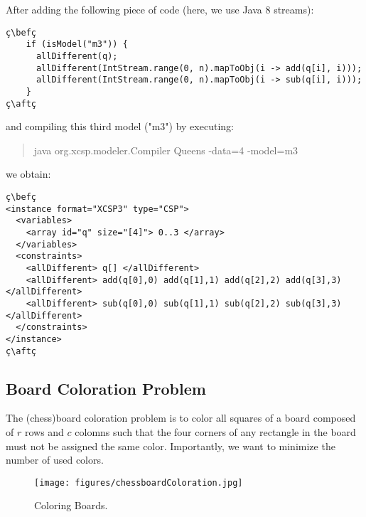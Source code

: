 \documentclass[10pt]{article}
\newcommand{\nn}[1]{{\tt #1}} %
\newenvironment{myvb}{\endgraf\small\verbatim}{\endverbatim}
\def\bef{\rule{10cm}{0.1mm}} %
\def\aft{\rule{10cm}{0.1mm}\medskip}
\begin{document}
After adding the following piece of code (here, we use Java 8 streams):
\begin{lstlisting}
ç\befç
    if (isModel("m3")) {
      allDifferent(q);
      allDifferent(IntStream.range(0, n).mapToObj(i -> add(q[i], i)));
      allDifferent(IntStream.range(0, n).mapToObj(i -> sub(q[i], i)));
    }
ç\aftç
\end{lstlisting}
and compiling this third model ("m3") by executing:
\begin{quote}
\begin{myvb}
java org.xcsp.modeler.Compiler Queens -data=4 -model=m3
\end{myvb}
\end{quote}
we obtain:
\begin{lstlisting}
ç\befç
<instance format="XCSP3" type="CSP">
  <variables>
    <array id="q" size="[4]"> 0..3 </array>
  </variables>
  <constraints>
    <allDifferent> q[] </allDifferent>
    <allDifferent> add(q[0],0) add(q[1],1) add(q[2],2) add(q[3],3) </allDifferent>
    <allDifferent> sub(q[0],0) sub(q[1],1) sub(q[2],2) sub(q[3],3) </allDifferent>
  </constraints>
</instance>
ç\aftç
\end{lstlisting}






\subsection{Board Coloration Problem}

The (chess)board coloration problem is to color all squares of a board composed of $r$ rows and $c$ colomns such that the four corners of any rectangle in the board must not be assigned the same color.
Importantly, we want to minimize the number of used colors.

\begin{figure}[h]
\begin{center}
  \texttt{[image: figures/chessboardColoration.jpg]}
\end{center}
\caption{Coloring Boards.\label{fig:board}}
\end{figure}
\end{document}
